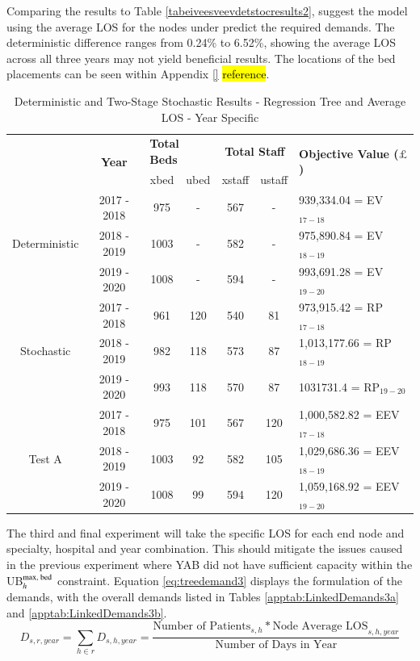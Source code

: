 \documentclass[../thesis.tex]{subfiles}
\begin{document}
Comparing the results to Table \ref{tabeiveesveevdetstocresults2}, suggest the model using the average LOS for the nodes under predict the required demands. The deterministic difference ranges from 0.24\% to 6.52\%, showing the average LOS across all three years may not yield beneficial results. The locations of the bed placements can be seen within Appendix \ref{} \hl{reference}.



\begin{table}[h!]
    \centering
    \begin{tabular}{ccccccl}\toprule
 & \multirow{2}{*}{\textbf{Year}}& \multicolumn{2}{l}{\textbf{Total Beds}} & \multicolumn{2}{c}{\textbf{Total Staff}} & \multirow{2}{*}{\textbf{Objective Value ($\pounds$)}}\\ \cmidrule(lr){3-4} \cmidrule(lr){5-6}
&& xbed           & ubed          & xstaff         & ustaff         \\ \midrule
     \multirow{3}{*}{Deterministic} & 2017 - 2018 & 975  & - & 567  & - &  939,334.04 =  EV$_{17-18}$ \\ 
      & 2018 - 2019 &1003 & - & 582 & - & 975,890.84 =  EV$_{18-19}$ \\
      & 2019 - 2020 & 1008 & - & 594 & - &  993,691.28 =  EV$_{19-20}$\\ \midrule
     \multirow{3}{*}{Stochastic} & 2017 - 2018 & 961 & 120 & 540 & 81 & 973,915.42 =  RP$_{17-18}$ \\ 
      & 2018 - 2019 & 982 &  118 & 573 & 87 & 1,013,177.66 =  RP$_{18-19}$ \\
      & 2019 - 2020 &993 & 118 &570 &87 & 1031731.4 =  RP$_{19-20}$\\ \midrule    
     \multirow{3}{*}{Test A} & 2017 - 2018 & 975 & 101 &  567 & 120 & 1,000,582.82
=  EEV$_{17-18}$ \\ 
      & 2018 - 2019& 1003 & 92& 582 & 105 &1,029,686.36 =  EEV$_{18-19}$ \\
      & 2019 - 2020 & 1008 & 99 & 594 &120 & 1,059,168.92 =  EEV$_{19-20}$\\ \bottomrule       
    \end{tabular}
    \caption{Deterministic and Two-Stage Stochastic Results - Regression Tree and Average LOS - Year Specific}
    \label{tab:Results2}
\end{table}



The third and final experiment will take the specific LOS for each end node and specialty, hospital and year combination. This should mitigate the issues caused in the previous experiment where YAB did not have sufficient capacity within the UB$_{h}^{\textnormal{max, bed}}$ constraint. Equation \eqref{eq:treedemand3} displays the formulation of the demands, with the overall demands listed in Tables \ref{apptab:LinkedDemands3a} and \ref{apptab:LinkedDemands3b}.
\begin{equation}\label{eq:treedemand3}
        D_{s,r,year} = \sum\limits_{h \in r} D_{s,h,year} = \frac{\text{Number of Patients}_{s,h}*\text{Node Average LOS}_{s,h,year}}{\text{Number of Days in Year}}
\end{equation}
\end{document}

